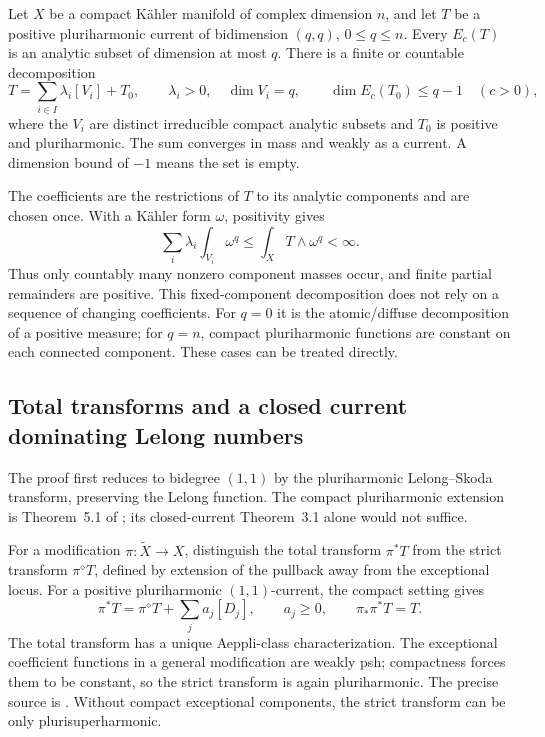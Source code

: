 \begin{theorem}
\label{thm:appH-pluriharmonic-Siu}
Let $X$ be a compact K\"ahler manifold of complex dimension $n$,
and let $T$ be a positive pluriharmonic current of bidimension
$(q,q)$, $0\leq q\leq n$. Every $E_c(T)$ is an analytic subset
of dimension at most $q$. There is a finite or countable decomposition
\begin{equation*}
 T=\sum_{i\in I}\lambda_i[V_i]+T_0,
 \qquad \lambda_i>0,\quad \dim V_i=q,
 \qquad \dim E_c(T_0)\leq q-1\quad(c>0),
\tag{H.56}\label{eq:appH-PH-Siu-decomposition}
\end{equation*}
where the $V_i$ are distinct irreducible compact analytic subsets and
$T_0$ is positive and pluriharmonic. The sum converges in mass and
weakly as a current. A dimension bound of $-1$ means the set is empty.
\end{theorem}

The coefficients are the restrictions of $T$ to its analytic components
and are chosen once. With a K\"ahler form $\omega$, positivity gives
\[
 \sum_i\lambda_i\int_{V_i}\omega^q\leq\int_XT\wedge\omega^q<\infty.
\]
Thus only countably many nonzero component masses occur, and finite
partial remainders are positive. This fixed-component decomposition
does not rely on a sequence of changing coefficients.
For $q=0$ it is the atomic/diffuse decomposition of a positive measure;
for $q=n$, compact pluriharmonic functions are constant on each
connected component. These cases can be treated directly.

\subsection{Total transforms and a closed current dominating Lelong numbers}
\label{sec:appH-PH-transforms}

The proof first reduces to bidegree $(1,1)$ by the pluriharmonic
Lelong--Skoda transform, preserving the Lelong function. The compact
pluriharmonic extension is Theorem~5.1 of
\cite[actual p.~12]{Vigny19LelongSkodaV2}; its closed-current
Theorem~3.1 alone would not suffice.

For a modification $\pi:\widetilde X\to X$, distinguish the total
transform $\pi^*T$ from the strict transform $\pi^\diamond T$,
defined by extension of the pullback away from the exceptional locus.
For a positive pluriharmonic $(1,1)$-current, the compact setting gives
\begin{equation*}
 \pi^*T=\pi^\diamond T+\sum_j a_j[D_j],\qquad a_j\geq0,
 \qquad \pi_*\pi^*T=T.
\tag{H.57}\label{eq:appH-PH-total-strict}
\end{equation*}
The total transform has a unique Aeppli-class characterization.
The exceptional coefficient functions in a general modification are
weakly psh; compactness forces them to be constant, so the strict
transform is again pluriharmonic. The precise source is
\cite[Theorems~3.9 and~3.11, printed pp.~725--728]{AlessandriniBassanelli03Transforms}.
Without compact exceptional components, the strict transform can be
only plurisuperharmonic.

